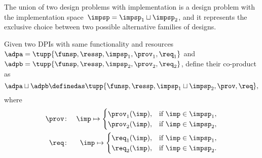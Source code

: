 
The union of two design problems with implementation is a design problem with the implementation space~$\impsp=\impsp_{1}\sqcup\impsp_{2}$, and it represents the exclusive choice between two possible alternative families of designs.

\begin{definition}
	\label{def:parallel-1}
	Given two DPIs with same functionality and resources~$\adpa=\tupp{\funsp,\ressp,\impsp_{1},\prov_{1},\req_{1}}$ and~$\adpb=\tupp{\funsp,\ressp,\impsp_{2},\prov_{2},\req_{2}}$, define their co-product as
	\begin{equation}
		\adpa\sqcup\adpb\definedas\tupp{\funsp,\ressp,\impsp_{1}\sqcup\impsp_{2},\prov,\req} ,
	\end{equation}
	where
	\begin{eqnarray}
		\prov & \colon & \imp\mapsto\begin{cases}
			\prov_{1}(\imp), & \text{if }\imp\in\impsp_{1}, \\
			\prov_{2}(\imp), & \text{if }\imp\in\impsp_{2},
		\end{cases}\label{eq:dppar-exec-1} \\
		\req  & \colon & \imp\mapsto\begin{cases}
			\req_{1}(\imp), & \text{if }\imp\in\impsp_{1}, \\
			\req_{2}(\imp), & \text{if }\imp\in\impsp_{2}.
		\end{cases}\nonumber
	\end{eqnarray}
\end{definition}

%

\begin{figure}[h!]
	\centering
	\caption{}
	\label{fig:dpcoproduct}
\end{figure}

